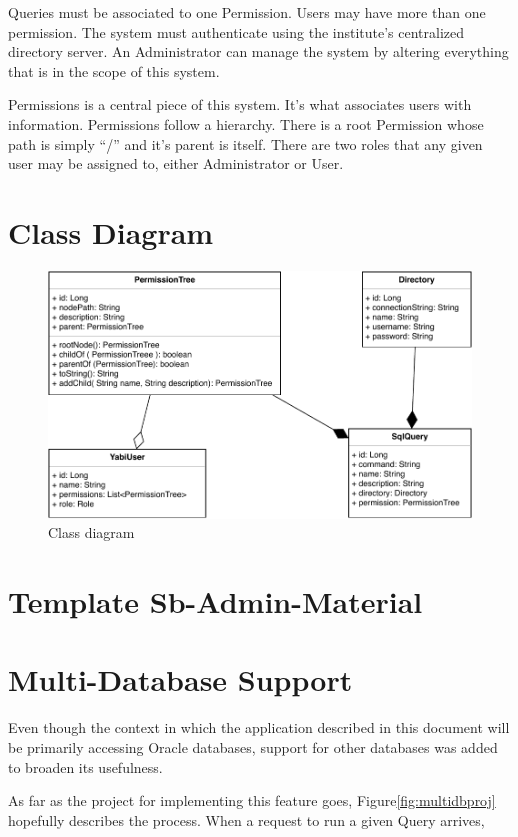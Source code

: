 Queries must be associated to one Permission.
Users may have more than one permission.
The system must authenticate using the institute's centralized directory server.
An Administrator can manage the system by altering everything that is in the scope of this system.

Permissions is a central piece of this system. It's what associates users with information.
Permissions follow a hierarchy. There is a root Permission whose path is simply ``/'' and it's parent is itself.
There are two roles that any given user may be assigned to, either Administrator or User.

\section{Class Diagram}
\begin{figure}
  \centering
  \includegraphics[width=.5\textwidth]{images/diagramas/class}
  \caption{Class diagram}\label{fig:classdiagram}
\end{figure}

\section{Template Sb-Admin-Material}
\section{Multi-Database Support}

Even though the context in which the application described in this document will be primarily accessing Oracle databases, support for other databases was added to broaden its usefulness.

As far as the project for implementing this feature goes, Figure\ref{fig:multidbproj} hopefully describes the process. When a request to run a given Query arrives,
